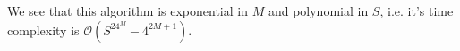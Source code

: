 We see that this algorithm is exponential in $M$ and polynomial in $S$, i.e.
it's time complexity is $\mathcal{O}(S^24^{M} - 4^{2M+1})$.








